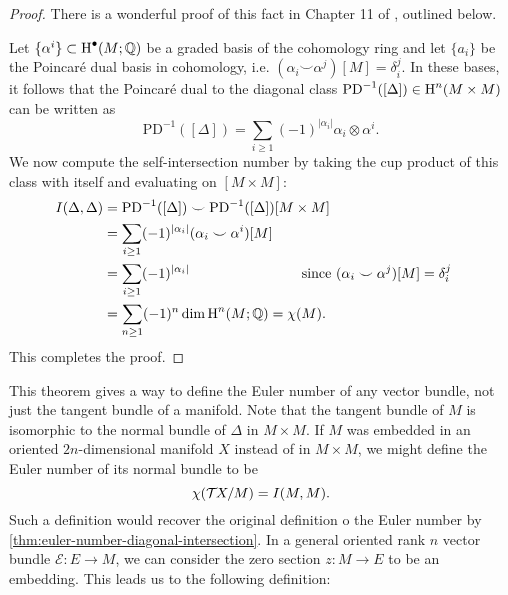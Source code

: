 \begin{proof}
  There is a wonderful proof of this fact in Chapter 11 of \cite{milnorstasheff1974}, outlined below.

  Let $\{\alpha^i\}\subset \operatorname{H}^\bullet(M; \mathbb{Q})$ be a graded basis of the cohomology ring and let $\{a_i\}$ be the Poincar\'e dual basis in cohomology, i.e. $(\alpha_i\smile \alpha^j)[M]=\delta^j_i$. 
  In these bases, it follows that the Poincar\'e dual to the diagonal class $\mathrm{PD}^{-1}([\Delta])\in \operatorname{H}^n(M\times M)$ can be written as
  \[
    \mathrm{PD}^{-1}([\Delta]) = \sum_{i\geq 1}(-1)^{|\alpha_i|}\alpha_i\otimes \alpha^i.
  \]
  We now compute the self-intersection number by taking the cup product of 
  this class with itself and evaluating on \([M \times M]\):
  \[
  \begin{aligned}
    I(\Delta, \Delta) &=
    \mathrm{PD}^{-1}([\Delta]) \smile \mathrm{PD}^{-1}([\Delta]) [M\times M]\\
                      &= \sum_{i\geq 1}(-1)^{|\alpha_i|}(\alpha_i\smile \alpha^i)
    [M]&\\
                &= \sum_{i\geq 1}(-1)^{|\alpha_i|}\hspace{8em}\textrm{since $(\alpha_i\smile \alpha^j)[M]=\delta^j_i$}&\\
    &= \sum_{n\geq 1} (-1)^n\dim \operatorname{H}^n(M;\mathbb{Q}) = \chi(M).
  \end{aligned}
  \]
  This completes the proof.
\end{proof}

This theorem gives a way to define the Euler number of any vector bundle, not just the tangent bundle of a manifold. Note that the tangent bundle of $M$ is isomorphic to the normal bundle of $\Delta$ in $M\times M$. If $M$ was embedded in an oriented $2n$-dimensional manifold $X$ instead of in $M\times M$, we might define the Euler number of its normal bundle to be
\[
    \chi({\mathcal{T}\hspace{-0.1em}} X/M) = I(M,M).
\]
Such a definition would recover the original definition o the Euler number by \cref{thm:euler-number-diagonal-intersection}. In a general oriented rank $n$ vector bundle $\mathcal{E} : E \to M$, we can consider the zero section $z : M \to E$ to be an embedding. This leads us to the following definition:

